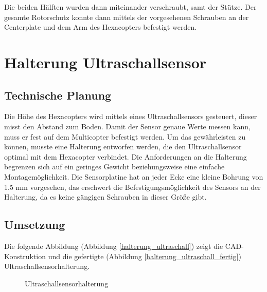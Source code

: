 Die beiden Hälften wurden dann miteinander verschraubt, samt der Stütze.
Der gesamte Rotorschutz konnte dann mittels der vorgesehenen Schrauben an der Centerplate und dem Arm des Hexacopters befestigt werden.

			\newpage

\section{Halterung Ultraschallsensor}

	\subsection{Technische Planung}

	Die Höhe des Hexacopters wird mittels eines Ultraschallsensors gesteuert, dieser misst den Abstand zum Boden.
	Damit der Sensor genaue Werte messen kann, muss er fest auf dem Multicopter befestigt werden.
	Um das gewährleisten zu können, musste eine Halterung entworfen werden, die den Ultraschallsensor optimal mit dem Hexacopter verbindet.
	Die Anforderungen an die Halterung begrenzen sich auf ein geringes Gewicht beziehungsweise eine einfache Montagemöglichkeit.
	Die Sensorplatine hat an jeder Ecke eine kleine Bohrung von 1.5 mm vorgesehen, das erschwert die Befestigungsmöglichkeit des Sensors an der Halterung, da es keine gängigen Schrauben in dieser Größe gibt.

	\subsection{Umsetzung}

	Die folgende Abbildung (Abbildung \ref{halterung_ultraschall}) zeigt die CAD-Konstruktion und die gefertigte (Abbildung \ref{halterung_ultraschall_fertig}) Ultraschallsensorhalterung.

			\begin{figure}[H]
				\begin{centering}
				\par\end{centering}
				\caption{Ultraschallsensorhalterung}
				\label{Halterung_Ultraschallsensor}
			\end{figure}


